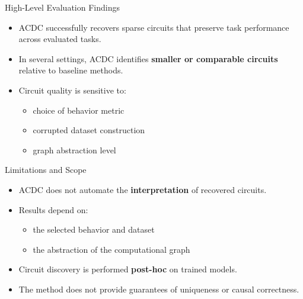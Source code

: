 \documentclass{beamer}
\begin{document}
	\begin{frame}{High-Level Evaluation Findings}
		\begin{itemize}
			\item \justifying ACDC successfully recovers sparse circuits
			that preserve task performance across evaluated tasks.
			
			\item \justifying In several settings, ACDC identifies
			\textbf{smaller or comparable circuits} relative
			to baseline methods.
			
			\item Circuit quality is sensitive to:
			\begin{itemize}
				\item choice of behavior metric
				\item corrupted dataset construction
				\item graph abstraction level
			\end{itemize}
		\end{itemize}
	\end{frame}
	
	\begin{frame}{Limitations and Scope}
		\begin{itemize}
			\item ACDC does not automate the
			\textbf{interpretation} of recovered circuits.
			
			\item Results depend on:
			\begin{itemize}
				\item the selected behavior and dataset
				\item the abstraction of the computational graph
			\end{itemize}
			
			\item Circuit discovery is performed
			\textbf{post-hoc} on trained models.
			
			\item \justifying The method does not provide guarantees
			of uniqueness or causal correctness.
		\end{itemize}
	\end{frame}
	
\end{document}
